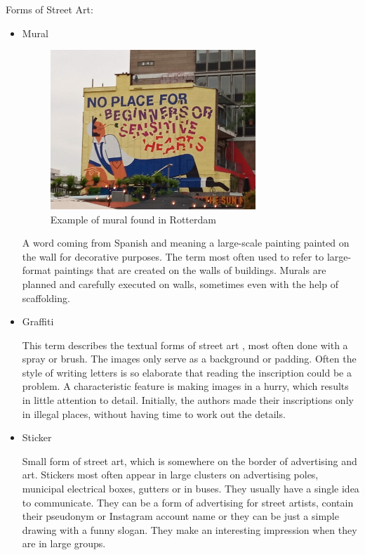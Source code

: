 \documentclass{report}
\begin{document}
Forms of Street Art:
    \begin{itemize}
    \item{Mural}
    
\begin{figure}[h]
\center
\includegraphics[height=6cm]{img/mural}
\caption{Example of mural found in Rotterdam}
\label{fig:mural}
\end{figure}
    
    A word coming from Spanish and meaning a large-scale painting painted on the wall for decorative purposes. The term most often used to refer to large-format paintings that are created on the walls of buildings. Murals are planned and carefully executed on walls, sometimes even with the help of scaffolding.
   
    
    
    \item{Graffiti}
    
    This term describes the textual forms of street art , most often done with a spray or brush. The images only serve as a background or padding. Often the style of writing letters is so elaborate that reading the inscription could be a problem. A characteristic feature is making images in a hurry, which results in little attention to detail. Initially, the authors made their inscriptions only in illegal places, without having time to work out the details.
    
    \item{Sticker}
    
    Small form of street art, which is somewhere on the border of advertising and art. Stickers most often appear in large clusters on advertising poles, municipal electrical boxes, gutters or in buses. They usually have a single idea to communicate. They can be a form of advertising for street artists, contain their pseudonym or Instagram account name or they can be just a simple drawing with a funny slogan. They make an interesting impression when they are in large groups.
    

\end{itemize}
\end{document}
